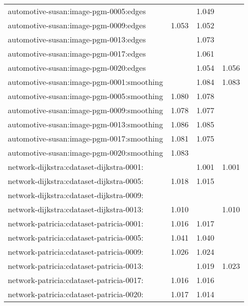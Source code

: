 \begin{longtable}{lrrr}
automotive-susan:image-pgm-0005:edges & \color{Green}{1.051} & 1.049 & \color{Green}{1.051} \\
automotive-susan:image-pgm-0009:edges & 1.053 & 1.052 & \color{Green}{1.054} \\
automotive-susan:image-pgm-0013:edges & \color{Green}{1.076} & 1.073 & \color{Green}{1.076} \\
automotive-susan:image-pgm-0017:edges & \color{Green}{1.063} & 1.061 & \color{Green}{1.063} \\
automotive-susan:image-pgm-0020:edges & \color{Green}{1.059} & 1.054 & 1.056 \\
automotive-susan:image-pgm-0001:smoothing & \color{Green}{1.085} & 1.084 & 1.083 \\
automotive-susan:image-pgm-0005:smoothing & 1.080 & 1.078 & \color{Green}{1.082} \\
automotive-susan:image-pgm-0009:smoothing & 1.078 & 1.077 & \color{Green}{1.079} \\
automotive-susan:image-pgm-0013:smoothing & 1.086 & 1.085 & \color{Green}{1.087} \\
automotive-susan:image-pgm-0017:smoothing & 1.081 & 1.075 & \color{Green}{1.082} \\
automotive-susan:image-pgm-0020:smoothing & 1.083 & \color{Green}{1.084} & \color{Green}{1.084} \\
network-dijkstra:cdataset-dijkstra-0001: & \color{Green}{1.002} & 1.001 & 1.001 \\
network-dijkstra:cdataset-dijkstra-0005: & 1.018 & 1.015 & \color{Green}{1.021} \\
network-dijkstra:cdataset-dijkstra-0009: & \color{Green}{1.013} & \color{Green}{1.013} & \color{Green}{1.013} \\
network-dijkstra:cdataset-dijkstra-0013: & 1.010 & \color{Green}{1.011} & 1.010 \\
network-patricia:cdataset-patricia-0001: & 1.016 & 1.017 & \color{Green}{1.048} \\
network-patricia:cdataset-patricia-0005: & 1.041 & 1.040 & \color{Green}{1.048} \\
network-patricia:cdataset-patricia-0009: & 1.026 & 1.024 & \color{Green}{1.028} \\
network-patricia:cdataset-patricia-0013: & \color{Green}{1.024} & 1.019 & 1.023 \\
network-patricia:cdataset-patricia-0017: & 1.016 & 1.016 & \color{Green}{1.018} \\
network-patricia:cdataset-patricia-0020: & 1.017 & 1.014 & \color{Green}{1.018} \\

\end{longtable}
